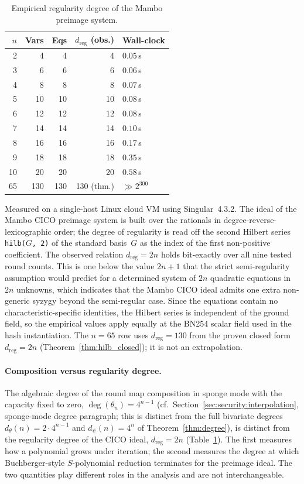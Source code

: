 \documentclass[11pt,a4paper]{article}
\theoremstyle{definition}
\begin{document}
\begin{table}[h]
\centering
\caption{Empirical regularity degree of the Mambo preimage system.}
\label{tab:groebner}
\begin{tabular}{@{}rrrrl@{}}
\toprule
$n$ & Vars & Eqs & $d_{\mathrm{reg}}$ (obs.) & Wall-clock \\
\midrule
2  &  4 &  4 &  4 & $0.05$\,s  \\
3  &  6 &  6 &  6 & $0.06$\,s  \\
4  &  8 &  8 &  8 & $0.07$\,s  \\
5  & 10 & 10 & 10 & $0.08$\,s  \\
6  & 12 & 12 & 12 & $0.08$\,s  \\
7  & 14 & 14 & 14 & $0.10$\,s  \\
8  & 16 & 16 & 16 & $0.17$\,s  \\
9  & 18 & 18 & 18 & $0.35$\,s  \\
10 & 20 & 20 & 20 & $0.58$\,s  \\
65 & 130 & 130 & 130 (thm.) & $\gg 2^{300}$ \\
\bottomrule
\end{tabular}
\smallskip

\footnotesize
Measured on a single-host Linux cloud VM using Singular~4.3.2. The ideal
of the Mambo CICO preimage system is built over the rationals in
degree-reverse-lexicographic order; the degree of regularity is read
off the second Hilbert series \texttt{hilb($G$,\,2)} of the standard
basis~$G$ as the index of the first non-positive coefficient. The
observed relation $d_{\mathrm{reg}} = 2n$ holds bit-exactly over all
nine tested round counts. This is one below the value $2n+1$ that the
strict semi-regularity assumption would predict for a determined
system of $2n$ quadratic equations in $2n$ unknowns, which indicates
that the Mambo CICO ideal admits one extra non-generic syzygy beyond
the semi-regular case. Since the equations contain no
characteristic-specific identities, the Hilbert series is independent
of the ground field, so the empirical values apply equally at the
BN254 scalar field used in the hash instantiation. The $n = 65$ row
uses $d_{\mathrm{reg}} = 130$ from the proven closed form
$d_{\mathrm{reg}} = 2n$ (Theorem~\ref{thm:hilb_closed}); it is not an
extrapolation.
\end{table}

\paragraph{Composition versus regularity degree.}
The algebraic degree of the round map composition in sponge mode with
the capacity fixed to zero,
$\deg(\theta_n) = 4^{n-1}$ (cf.\ Section~\ref{sec:security:interpolation},
sponge-mode degree paragraph; this is distinct from the full bivariate
degrees $d_\theta(n) = 2 \cdot 4^{n-1}$ and $d_\psi(n) = 4^n$ of
Theorem~\ref{thm:degree}), is distinct from
the regularity degree of the CICO ideal,
$d_{\mathrm{reg}} = 2n$ (Table~\ref{tab:groebner}). The first measures
how a polynomial grows under iteration; the second measures the degree
at which Buchberger-style $S$-polynomial reduction terminates for the
preimage ideal. The two quantities play different roles in the
analysis and are not interchangeable.
\end{document}

